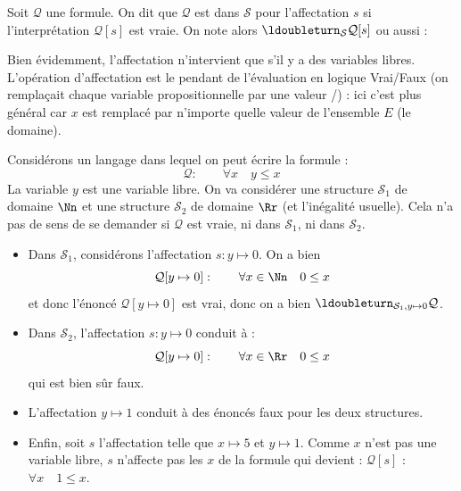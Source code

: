 \documentclass[11pt,class=report,crop=false]{standalone}
\begin{document}
\begin{definition}
Soit $\mathcal{Q}$ une formule.
On dit que $\mathcal{Q}$ est  dans $\mathcal{S}$ pour l'affectation $s$ si l'interprétation $\mathcal{Q}[s]$ est vraie. On note alors $\ldoubleturn_{\mathcal{S}} \mathcal{Q}[s]$ ou aussi :
\end{definition}


Bien évidemment, l'affectation n'intervient que s'il y a des variables libres.
L'opération d'affectation est le pendant de l'évaluation en logique Vrai/Faux (on remplaçait chaque variable propositionnelle par une valeur \ltrue/\lfalse) : ici c'est plus général car $x$ est remplacé par n'importe quelle valeur de l'ensemble $E$ (le domaine).

\begin{exemple}
Considérons un langage dans lequel on peut écrire la formule :
\[
\mathcal{Q} : \qquad \forall x \quad y \le x
\]	
La variable $y$ est une variable libre. On va considérer une structure $\mathcal{S}_1$ de domaine $\Nn$ et une structure $\mathcal{S}_2$ de domaine $\Rr$ (et l'inégalité usuelle).
Cela n'a pas de sens de se demander si $\mathcal{Q}$ est vraie, ni dans $\mathcal{S}_1$, ni dans $\mathcal{S}_2$. 

\begin{itemize}
	\item Dans $\mathcal{S}_1$, considérons l'affectation $s : y \mapsto 0$. On a bien
\[
\mathcal{Q}[y \mapsto 0] : \qquad \forall x \in \Nn \quad 0 \le x
\]		
et donc l'énoncé $\mathcal{Q}[y \mapsto 0]$ est vrai, donc on a bien $\ldoubleturn_{\mathcal{S}_1,y\mapsto 0} \mathcal{Q}$.

	\item Dans $\mathcal{S}_2$, l'affectation $s : y \mapsto 0$ conduit à :
\[
\mathcal{Q}[y \mapsto 0] : \qquad \forall x \in \Rr \quad 0 \le x
\]	
qui est bien sûr faux.
	
	\item L'affectation $y \mapsto 1$ conduit à des énoncés faux pour les deux structures.
	
	\item Enfin, soit $s$ l'affectation telle que $x \mapsto 5$ et $y \mapsto 1$.
	Comme $x$ n'est pas une variable libre, $s$ n'affecte pas les $x$ de la formule qui devient : $\mathcal{Q}[s]$ : \og{}$\forall x \quad 1 \le x$\fg{}.
\end{itemize}
\end{exemple}
\end{document}
